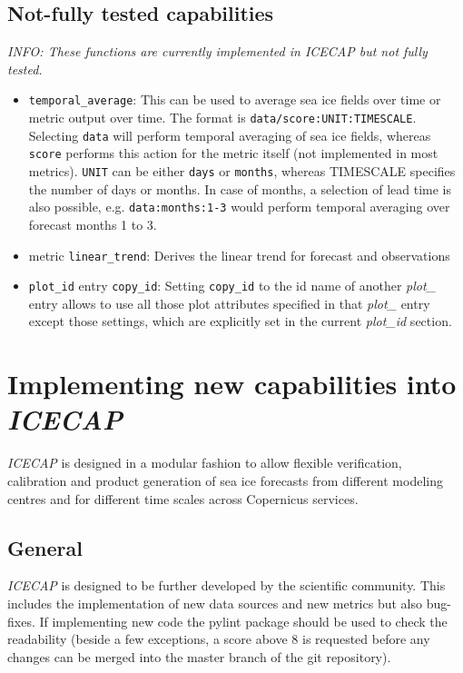 \documentclass[DIV=10, parskip=full]{scrreprt}
\newcommand{\ice}{\textit{ICECAP}\xspace}
\newcommand{\info}[1]{\textit{INFO: #1}}
\begin{document}
\subsection{Not-fully tested capabilities}
\info{These functions are currently implemented in \ice but not fully tested.}

\begin{itemize}
	\item \texttt{temporal\_average}: This can be used to average sea ice fields over time or metric output over time. The format is \texttt{data/score:UNIT:TIMESCALE}. Selecting \texttt{data} will perform temporal averaging of sea ice fields, whereas \texttt{score} performs this action for the metric itself (not implemented in most metrics). \texttt{UNIT} can be either \texttt{days} or \texttt{months}, whereas {TIMESCALE} specifies the number of days or months. In case of months, a selection of lead time is also possible, e.g. \texttt{data:months:1-3} would perform temporal averaging over forecast months 1 to 3.
	\item metric \texttt{linear\_trend}: Derives the linear trend for forecast and observations
	\item \texttt{plot\_id} entry \texttt{copy\_id}: Setting \texttt{copy\_id} to the id name of another \textit{plot\_} entry allows to use all those plot attributes specified in that \textit{plot\_} entry except those settings, which are explicitly set in the current  \textit{plot\_id} section.
\end{itemize}

\section{Implementing new capabilities into  \ice}\label{chap:develop}
\ice is designed in a modular fashion to allow flexible verification, calibration and product generation of sea ice forecasts from different modeling centres and for different time scales across Copernicus services. 

\subsection{General}
\ice is designed to be further developed by the scientific community. This includes the implementation of new data sources and new metrics but also bug-fixes. If implementing new code the pylint package should be used to check the readability (beside a few exceptions, a score above 8 is requested before any changes can be merged into the master branch of the git repository).
\end{document}
